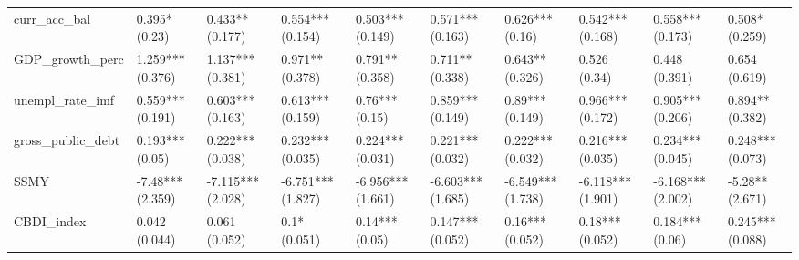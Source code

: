 \begin{table}[ht]
\begin{tabular}{llllllllll}
  curr\_acc\_bal & 0.395* (0.23) & 0.433** (0.177) & 0.554*** (0.154) & 0.503*** (0.149) & 0.571*** (0.163) & 0.626*** (0.16) & 0.542*** (0.168) & 0.558*** (0.173) & 0.508* (0.259) \\ 
  GDP\_growth\_perc & 1.259*** (0.376) & 1.137*** (0.381) & 0.971** (0.378) & 0.791** (0.358) & 0.711** (0.338) & 0.643** (0.326) & 0.526 (0.34) & 0.448 (0.391) & 0.654 (0.619) \\ 
  unempl\_rate\_imf & 0.559*** (0.191) & 0.603*** (0.163) & 0.613*** (0.159) & 0.76*** (0.15) & 0.859*** (0.149) & 0.89*** (0.149) & 0.966*** (0.172) & 0.905*** (0.206) & 0.894** (0.382) \\ 
  gross\_public\_debt & 0.193*** (0.05) & 0.222*** (0.038) & 0.232*** (0.035) & 0.224*** (0.031) & 0.221*** (0.032) & 0.222*** (0.032) & 0.216*** (0.035) & 0.234*** (0.045) & 0.248*** (0.073) \\ 
  SSMY & -7.48*** (2.359) & -7.115*** (2.028) & -6.751*** (1.827) & -6.956*** (1.661) & -6.603*** (1.685) & -6.549*** (1.738) & -6.118*** (1.901) & -6.168*** (2.002) & -5.28** (2.671) \\ 
  CBDI\_index & 0.042 (0.044) & 0.061 (0.052) & 0.1* (0.051) & 0.14*** (0.05) & 0.147*** (0.052) & 0.16*** (0.052) & 0.18*** (0.052) & 0.184*** (0.06) & 0.245*** (0.088) \\ 
   \bottomrule
\end{tabular}
\endgroup
\end{table}
